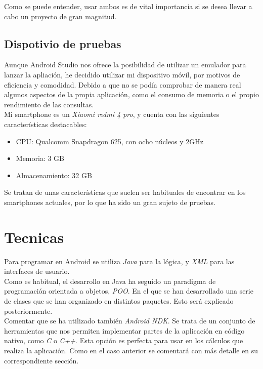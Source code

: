 Como se puede entender, usar ambos es de vital importancia si se desea llevar a cabo un proyecto de gran magnitud.

\subsection{Dispotivio de pruebas}

Aunque Android Studio nos ofrece la posibilidad de utilizar un emulador para lanzar la apliación, he decidido utilizar mi dispositivo móvil, por motivos de eficiencia y comodidad. Debido a que no se podía comprobar de manera real algunos aspectos de la propia aplicación, como el consumo de memoria o el propio rendimiento de las consultas.\\

Mi smartphone es un \textit{Xiaomi redmi 4 pro}, y cuenta con las siguientes características destacables:

\begin{itemize}
\item CPU: Qualcomm Snapdragon 625, con ocho núcleos y 2GHz 
\item Memoria: 3 GB
\item Almacenamiento: 32 GB
\end{itemize}

Se tratan de unas características que suelen ser habituales de encontrar en los smartphones actuales, por lo que ha sido un gran sujeto de pruebas.

\section{Tecnicas}

Para programar en Android se utiliza \textit{Java} para la lógica, y \textit{XML} para las interfaces de usuario.\\

Como es habitual, el desarrollo en Java ha seguido un paradigma de programación orientada a objetos, \textit{POO}. En el que se han desarrollado una serie de clases que se han organizado en distintos paquetes. Esto será explicado posteriormente.\\ 

Comentar que se ha utilizado también \textit{Android NDK}. Se trata de un conjunto de herramientas que nos permiten implementar partes de la aplicación en código nativo, como \textit{C} o \textit{C++}. Esta opción es perfecta para usar en los cálculos que realiza la aplicación. Como en el caso anterior se comentará con más detalle en su correspondiente sección.\\

